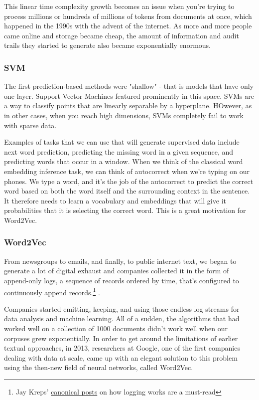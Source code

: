 \documentclass[draft, 11pt]{diazessay} %
\begin{document}
This linear time complexity growth becomes an issue when you're trying to process millions or hundreds of millions of tokens from documents at once, which happened in the 1990s with the advent of the internet.  As more and more people came online and storage became cheap, the amount of information and audit trails they started to generate also became exponentially enormous.  
\subsubsection{SVM}
The first prediction-based methods were "shallow" - that is models that have only one layer\citep{collobert2008unified}. Support Vector Machines featured prominently in this space. SVMs are a way to classify points that are linearly separable by a hyperplane. HOwever, as in other cases, when you reach high dimensions, SVMs completely fail to work with sparse data. 

Examples of tasks that we can use that will generate supervised data include next word prediction, predicting the missing word in a given sequence, and predicting words that occur in a window. When we think of the classical word embedding inference task, we can think of autocorrect when we're typing on our phones. We type a word, and it's the job of the autocorrect to predict the correct word based on both the word itself and the surrounding context in the sentence. It therefore needs to learn a vocabulary and embeddings that will give it probabilities that it is selecting the correct word. This is a great motivation for Word2Vec. 

\subsubsection{Word2Vec}

From newsgroups to emails, and finally, to public internet text, we began to generate a lot of digital exhaust and companies collected it in the form of append-only logs\citep{kreps2014heart}, a sequence of records ordered by time, that's configured to continuously append records.\footnote{Jay Kreps' \href{https://engineering.linkedin.com/distributed-systems/log-what-every-software-engineer-should-know-about-real-time-datas-unifying}{canonical posts} on how logging works are a must-read} . 

Companies started emitting, keeping, and using those endless log streams for data analysis and machine learning. All of a sudden, the algorithms that had worked well on a collection of 1000 documents didn't work well when our corpuses grew exponentially. In order to get around the limitations of earlier textual approaches, in 2013, researchers at Google, one of the first companies dealing with data at scale, came up with an elegant solution to this problem using the then-new field of neural networks, called Word2Vec\citep{mikolov2013efficient}.  
\end{document}
